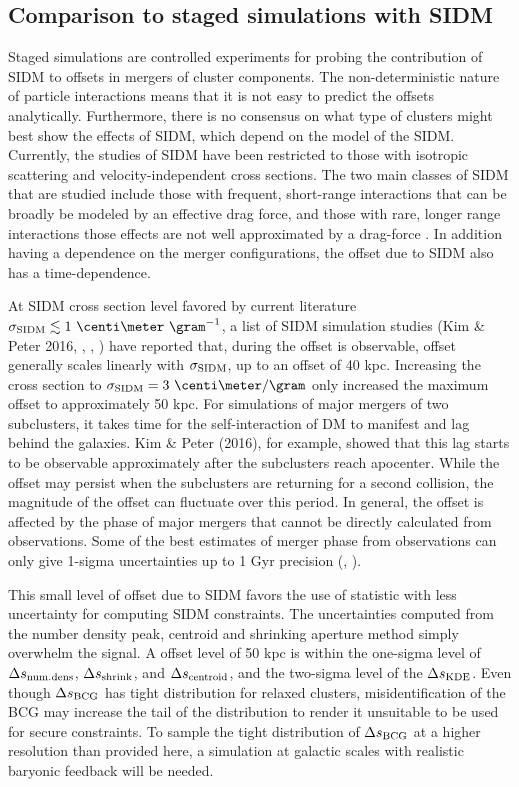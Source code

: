   
\subsection{Comparison to staged simulations with SIDM}
\label{subsec:SIDM_sim}
Staged simulations are controlled experiments for probing the contribution
of SIDM to offsets in mergers of cluster components. 
The non-deterministic nature of particle interactions means that it is not easy
to predict the offsets analytically.
Furthermore, there is no consensus on what type of clusters might best show the
effects of SIDM, which depend on the model of the SIDM.
Currently, the studies of SIDM have been restricted to those with isotropic
scattering and velocity-independent cross sections.   
The two main classes of SIDM that are studied include those with 
frequent, short-range interactions that can be broadly be modeled by an
effective drag force, and those with rare, longer range interactions those
effects are not well approximated by a drag-force \citep{Kahlhoefer14}. 
In addition having a dependence on the merger configurations, the offset due to
SIDM also has a time-dependence.    

At SIDM cross section level favored by current literature $\sigma_{\rm SIDM}
\lesssim 1~\centi\meter ~\gram^{-1}$, a list of SIDM simulation studies (Kim \&
Peter 2016, \citealt{Robertson2016}, \citealt{Kahlhoefer14}, \citealt{Randall2008d})
have reported that, during the offset is observable, 
offset generally scales linearly with $\sigma_{\rm SIDM}$,  
up to an offset of 40 kpc.  Increasing the cross section to $\sigma_{\rm SIDM} = 3
~\centi\meter / \gram$ only increased the maximum offset to approximately 50 kpc.
For simulations of major mergers of two subclusters, it takes time for the self-interaction of DM
to manifest and lag behind the galaxies. Kim \& Peter (2016), for example, showed that
this lag starts to be observable approximately after the subclusters reach apocenter. 
While the offset may persist when the subclusters are returning for a
second collision, the magnitude of the offset can fluctuate over this period.
In general, the offset is affected by the phase of major mergers that cannot be
directly calculated from observations. Some of the best estimates of merger
phase from observations
can only give 1-sigma uncertainties up
to 1 Gyr precision (\citealt{D13}, \citealt{Ng2014}).

This small level of offset due to SIDM favors the use of statistic 
with less uncertainty for computing SIDM constraints. 
The uncertainties computed from the number density peak, centroid and shrinking
aperture method simply overwhelm the signal. 
A offset level of 50 kpc is within the one-sigma level of $\Delta s_{\rm num.
dens}$, $\Delta s_{\rm shrink}$, and $\Delta s_{\rm centroid}$, and the two-sigma
level of the $\Delta s_{\rm KDE}$. 
Even though $\Delta s_{\rm BCG}$ has tight distribution for relaxed clusters, misidentification of the BCG 
may increase the tail of the distribution to render it unsuitable to be used 
for secure constraints. To sample the tight distribution of $\Delta s_{\rm
BCG}$ at a higher
resolution than provided here, a simulation at galactic scales with realistic
baryonic feedback will be needed. 

